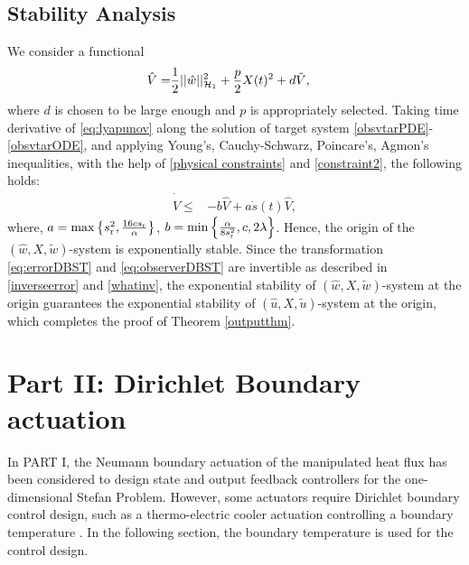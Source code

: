 \documentclass[journal]{IEEEtran}
\begin{document}
\subsection{Stability Analysis}\label{outputstability}
We consider a functional
\begin{align}\label{eq:obsvlyapunov}
\hat{V} = &\frac{1}{2} ||\hat{w}||_{{\cal H}_1}^2+\frac{p}{2}X(t)^2+d\tilde{V},
\end{align}
where $d$ is chosen to be large enough and $p$ is appropriately selected. Taking time derivative of \eqref{eq:lyapunov} along the solution of target system \eqref{obsvtarPDE}-\eqref{obsvtarODE}, and applying Young's, Cauchy-Schwarz, Poincare's, Agmon's inequalities, with the help of  \eqref{physical constraints} and \eqref{constraint2}, the following  holds:
\begin{align}\label{estimatelyap}
\dot{\hat{V}}\leq & -b\hat{V} +a\dot{s}(t)\hat{V},
\end{align}
where, $a = {\rm max} \left\{ s_{{\mathrm r}}^2, \frac{16cs_{{\mathrm r}}}{\alpha}\right\}$, $b = {\rm min}\left\{\frac{\alpha}{8s_{{\mathrm r}}^2}, c, 2\lambda\right\}$. Hence, the origin of the $(\hat{w}, X, \tilde{w})$-system is exponentially stable. Since the transformation \eqref{eq:errorDBST} and \eqref{eq:observerDBST} are  invertible as described in \eqref{inverseerror} and \eqref{whatinv},  the exponential stability of $(\hat{w}, X, \tilde{w})$-system at the origin guarantees the exponential stability of $(\hat{u}, X, \tilde{u})$-system at the origin, which completes the proof of Theorem \ref{outputthm}. 
\section*{Part II:  Dirichlet Boundary actuation}
In PART I,  the Neumann boundary actuation of the manipulated heat flux has been considered to design state and output feedback controllers for the one-dimensional Stefan Problem. However, some actuators require Dirichlet boundary control design, such as a thermo-electric cooler actuation controlling a boundary temperature \cite{Boon2014}. In the following section, the boundary temperature is used for the control design. 
\end{document}
